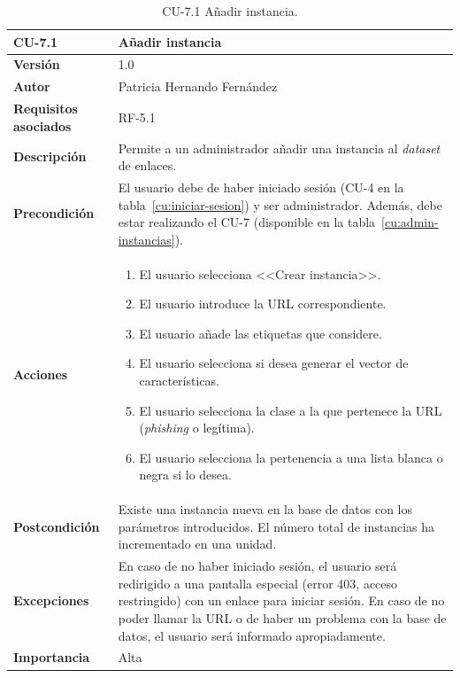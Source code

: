 \begin{table}[p]
	\centering
	\begin{tabularx}{\linewidth}{ p{} p{} }
		\toprule
		\textbf{CU-7.1}    & \textbf{Añadir instancia}\\
		\toprule
		\textbf{Versión}              & 1.0    \\
		\textbf{Autor}                & Patricia Hernando Fernández \\
		\textbf{Requisitos asociados} & RF-5.1 \\
		\textbf{Descripción}          & Permite a un administrador añadir una instancia al \textit{dataset} de enlaces.\\
		\textbf{Precondición}         & El usuario debe de haber iniciado sesión (CU-4 en la tabla~\ref{cu:iniciar-sesion}) y ser administrador. Además, debe estar realizando el CU-7 (disponible en la tabla~\ref{cu:admin-instancias}). \\
		\textbf{Acciones}             &
		\begin{enumerate}
			\def\labelenumi{\arabic{enumi}.}
			\tightlist
			\item El usuario selecciona <<Crear instancia>>.
			\item El usuario introduce la URL correspondiente.
			\item El usuario añade las etiquetas que considere.
			\item El usuario selecciona si desea generar el vector de características.
			\item El usuario selecciona la clase a la que pertenece la URL (\textit{phishing} o legítima).
			\item El usuario selecciona la pertenencia a una lista blanca o negra si lo desea.
		\end{enumerate}\\
		\textbf{Postcondición}        & Existe una instancia nueva en la base de datos con los parámetros introducidos. El número total de instancias ha incrementado en una unidad. \\
		\textbf{Excepciones}          & En caso de no haber iniciado sesión, el usuario será redirigido a una pantalla especial (error 403, acceso restringido) con un enlace para iniciar sesión. En caso de no poder llamar la URL o de haber un problema con la base de datos, el usuario será informado apropiadamente.\\
		\textbf{Importancia}          & Alta \\
		\bottomrule
	\end{tabularx}
	\caption{CU-7.1 Añadir instancia.}
	\label{cu:anadir-instancia}
\end{table}


